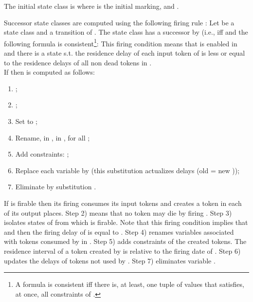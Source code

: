 \documentclass[submission,copyright,creativecommons]{eptcs}
\numberwithin{equation}{section}
\begin{document}
\par The initial state class is  where  is the initial marking,  and .
\par Successor state classes are computed using the following firing rule \cite{BVer03}:
Let  be a state class and  a transition of . The state
class  has a successor by  (i.e.,
 iff
  and the following formula is
 consistent\footnote{A formula  is consistent iff there is, at least, one tuple of values that satisfies, at once, all constraints of .}: 
This firing condition means that  is enabled in  and there is a state s.t. the residence delay of each input token of  is less or equal to the residence delays of all non dead tokens in .\\
If  then  is computed as follows:\begin{enumerate} \item ;
 \item ;
 \item Set  to ;\item Rename, in ,  in , for all ; \item Add constraints: ; \item Replace each variable  by  (this substitution actualizes delays (old  = new ));
\item Eliminate by substitution .
\end{enumerate}
If  is firable then its firing consumes its input tokens and creates a token in each of its output places. Step 2) means that no token may die by firing . Step 3) isolates states of  from which  is firable. Note that this firing condition implies that  and then the firing delay  of  is equal to . Step 4) renames variables associated with tokens consumed by  in . Step 5) adds constraints of the created tokens. The residence interval of a token created by  is relative to the firing date of . Step 6) updates the delays of tokens not used by . Step 7) eliminates variable .
 \medskip \medskip
\end{document}
